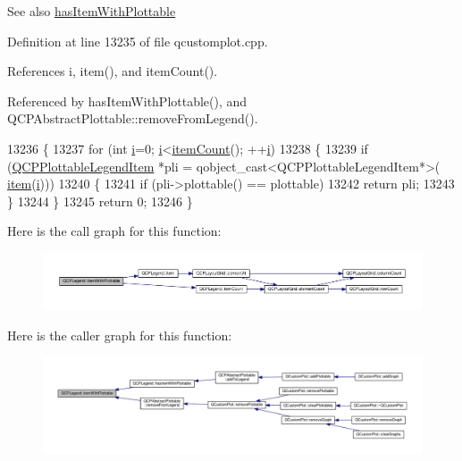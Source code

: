 \begin{DoxySeeAlso}{See also}
\hyperlink{class_q_c_p_legend_a2eb1d24bdf5658e64962a656303fd61a}{has\+Item\+With\+Plottable} 
\end{DoxySeeAlso}


Definition at line 13235 of file qcustomplot.\+cpp.



References i, item(), and item\+Count().



Referenced by has\+Item\+With\+Plottable(), and Q\+C\+P\+Abstract\+Plottable\+::remove\+From\+Legend().


\begin{DoxyCode}
13236 \{
13237   \textcolor{keywordflow}{for} (\textcolor{keywordtype}{int} \hyperlink{_comparision_pictures_2_createtest_image_8m_a6f6ccfcf58b31cb6412107d9d5281426}{i}=0; \hyperlink{_comparision_pictures_2_createtest_image_8m_a6f6ccfcf58b31cb6412107d9d5281426}{i}<\hyperlink{class_q_c_p_legend_a198228e9cdc78d3a3c306fa6763d0404}{itemCount}(); ++\hyperlink{_comparision_pictures_2_createtest_image_8m_a6f6ccfcf58b31cb6412107d9d5281426}{i})
13238   \{
13239     \textcolor{keywordflow}{if} (\hyperlink{class_q_c_p_plottable_legend_item}{QCPPlottableLegendItem} *pli = qobject\_cast<QCPPlottableLegendItem*>(
      \hyperlink{class_q_c_p_legend_a454272d7094437beb3278a2294006da5}{item}(\hyperlink{_comparision_pictures_2_createtest_image_8m_a6f6ccfcf58b31cb6412107d9d5281426}{i})))
13240     \{
13241       \textcolor{keywordflow}{if} (pli->plottable() == plottable)
13242         \textcolor{keywordflow}{return} pli;
13243     \}
13244   \}
13245   \textcolor{keywordflow}{return} 0;
13246 \}
\end{DoxyCode}


Here is the call graph for this function\+:\nopagebreak
\begin{figure}[H]
\begin{center}
\leavevmode
\includegraphics[width=350pt]{class_q_c_p_legend_a5ee80cf83f65e3b6dd386942ee3cc1ee_cgraph}
\end{center}
\end{figure}




Here is the caller graph for this function\+:\nopagebreak
\begin{figure}[H]
\begin{center}
\leavevmode
\includegraphics[width=350pt]{class_q_c_p_legend_a5ee80cf83f65e3b6dd386942ee3cc1ee_icgraph}
\end{center}
\end{figure}


